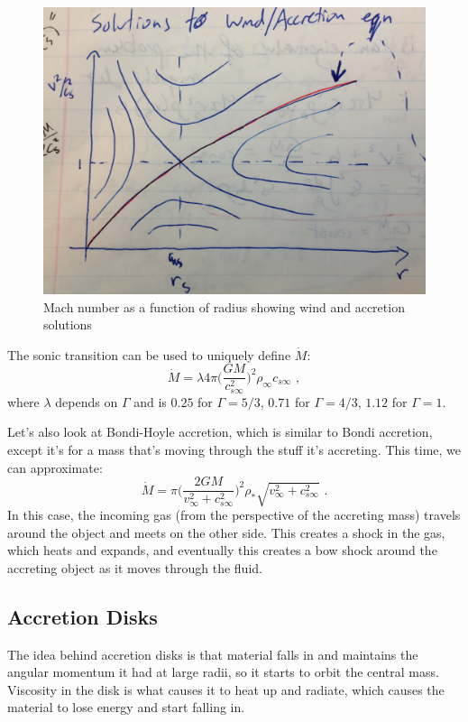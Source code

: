 \begin{figure}[!h]
\begin{center}
\includegraphics[width=\textwidth]{mach.jpg}
\caption{Mach number as a function of radius showing wind and accretion solutions \label{f:mach}}
\end{center}
\end{figure}

The sonic transition can be used to uniquely define $\dot{M}$:
\begin{equation}
\dot{M} = \lambda 4 \pi \biggl( \frac{G M}{c_{s \infty}^2} \biggr) ^2 \rho_\infty c_{s \infty}\,\, ,
\end{equation}
where $\lambda$ depends on $\Gamma$ and is $0.25$ for $\Gamma = 5/3$, $0.71$ for $\Gamma = 4/3$, $1.12$ for $\Gamma = 1$.

Let's also look at Bondi-Hoyle accretion, which is similar to Bondi accretion, except it's for a mass that's moving through the stuff it's accreting. This time, we can approximate:
\begin{equation}
\dot{M} = \pi \biggl(\frac{2 G M}{v_\infty ^2 + c_{s \infty}^2} \biggr)^2 \rho_* \sqrt{v_\infty ^2 + c_{s \infty}^2}\,\, .
\end{equation}
In this case, the incoming gas (from the perspective of the accreting mass) travels around the object and meets on the other side. This creates a shock in the gas, which heats and expands, and eventually this creates a bow shock around the accreting object as it moves through the fluid.

\subsection{Accretion Disks}

The idea behind accretion disks is that material falls in and maintains the angular momentum it had at large radii, so it starts to orbit the central mass. Viscosity in the disk is what causes it to heat up and radiate, which causes the material to lose energy and start falling in.



